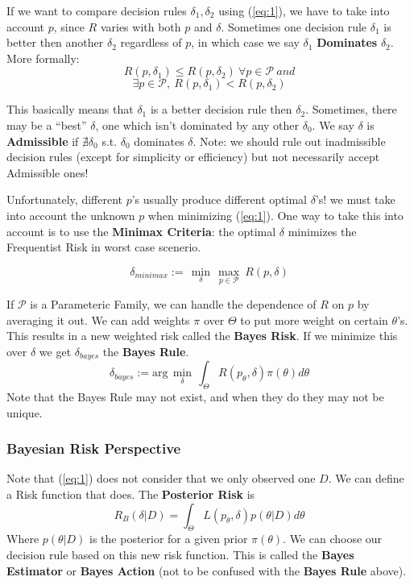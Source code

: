 \documentclass[]{article}
\theoremstyle{mattstyle}
\theoremstyle{definition}
\begin{document}
If we want to compare decision rules \(\delta_1, \delta_2\) using (\ref{eq:1}), we have to take into account \(p\), since \(R\) varies with both \(p\) and \(\delta\). Sometimes one decision rule \(\delta_1\) is better then another \(\delta_2\) regardless of \(p\), in which case we say \(\delta_1\) \textbf{Dominates} \(\delta_2\).
More formally:
$$R(p,\delta_1)\leq R(p,\delta_2) \ \forall p \in \mathcal{P}\ and$$
$$\exists p \in \mathcal{P},\ R(p,\delta_1) < R(p, \delta_2)$$

This basically means that \(\delta_1\) is a better decision rule then \(\delta_2\). Sometimes, there may be a ``best'' \(\delta\), one which isn't dominated by any other \(\delta_0\). We say \(\delta\) is \textbf{Admissible} if $\nexists \delta_0$ s.t. $\delta_0$ dominates $\delta$. Note: we should rule out inadmissible decision rules (except for simplicity or efficiency) but not necessarily accept Admissible ones!

Unfortunately, different \(p\)'s usually produce different optimal \(\delta\)'s! we must take into account the unknown \(p\) when minimizing (\ref{eq:1}). One way to take this into account is to use the \textbf{Minimax Criteria}: the optimal \(\delta\) minimizes the Frequentist Risk in worst case scenerio.

\begin{equation}\delta_{minimax} := \,\min\limits_{\delta}\,\max\limits_{p \in \mathcal{P}}\ R(p,\delta)
\end{equation}

If \(\mathcal{P}\) is a Parameteric Family, we can handle the dependence of \(R\) on \(p\) by averaging it out. We can add weights \(\pi\) over $\Theta$ to put more weight on certain $\theta$'s. This results in a new weighted risk called the \textbf{Bayes Risk}. If we minimize this over \(\delta\) we get $\delta_{bayes}$ the \textbf{Bayes Rule}.
\begin{equation}\label{eq:3}
\delta_{bayes}:= \text{arg}\,\min\limits_{\delta}\,\int_{\Theta}^{}R(p_\theta,\delta)\pi(\theta)d\theta
\end{equation}
Note that the Bayes Rule may not exist, and when they do they may not be unique. 

\subsubsection{Bayesian Risk Perspective} 

Note that (\ref{eq:1}) does not consider that we only observed one \(D\). We can define a Risk function that does. The \textbf{Posterior Risk} is
\begin{equation}\label{eq:2}R_B(\delta|D) = \int_{\Theta}^{}L(p_{\theta},\delta)p(\theta|D)d\theta
\end{equation}
Where $p(\theta|D)$ is the posterior for a given prior $\pi(\theta)$. We can choose our decision rule based on this new risk function. This is called the \textbf{Bayes Estimator} or \textbf{Bayes Action} (not to be confused with the \textbf{Bayes Rule} above).
\end{document}
